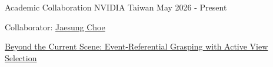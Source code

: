 
\begin{cventries}
  \cventry
    {Academic Collaboration}
    {NVIDIA}
    {Taiwan}
    {May 2026 - Present}
    {
      \begin{cvitems}
        \item {Collaborator: \href{https://jaesung-choe.github.io/}{Jaesung Choe}}
        \item {\href{https://www.haebeom.com/BeyondCSe/}{Beyond the Current Scene: Event-Referential Grasping with Active View Selection}}
      \end{cvitems}
    }
\end{cventries}
